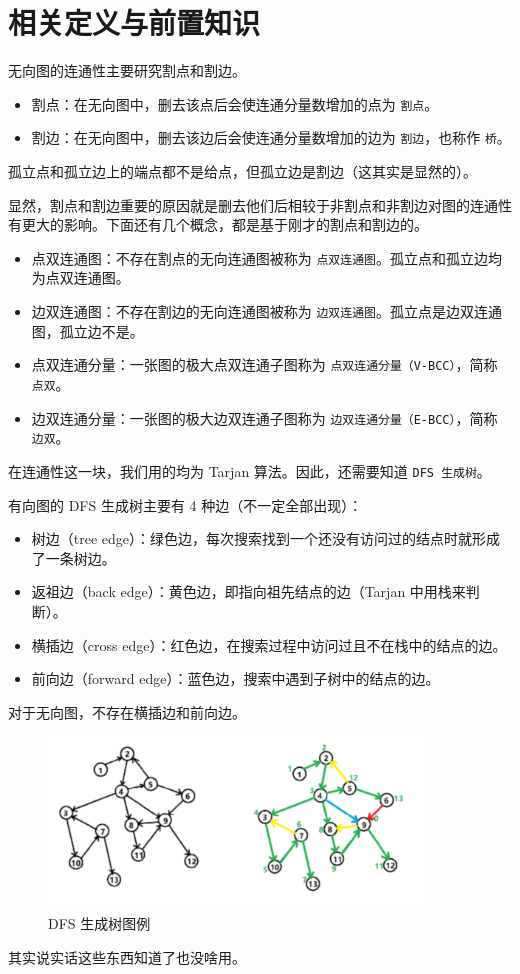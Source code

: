 \documentclass[10pt,twoside,a4paper,UTF8]{ctexbook}
\begin{document}
	\section{相关定义与前置知识}
	无向图的连通性主要研究割点和割边。
	\begin{itemize}
		\item 割点：在无向图中，删去该点后会使连通分量数增加的点为 \texttt{割点}。
		\item 割边：在无向图中，删去该边后会使连通分量数增加的边为 \texttt{割边}，也称作 \texttt{桥}。
	\end{itemize}
	\noindent
	孤立点和孤立边上的端点都不是给点，但孤立边是割边（这其实是显然的）。\par
	显然，割点和割边重要的原因就是删去他们后相较于非割点和非割边对图的连通性有更大的影响。下面还有几个概念，都是基于刚才的割点和割边的。\par
	\begin{itemize}
		\item 点双连通图：不存在割点的无向连通图被称为 \texttt{点双连通图}。孤立点和孤立边均为点双连通图。
		\item 边双连通图：不存在割边的无向连通图被称为 \texttt{边双连通图}。孤立点是边双连通图，孤立边不是。
		\item 点双连通分量：一张图的极大点双连通子图称为 \texttt{点双连通分量（V-BCC）}，简称 \texttt{点双}。
		\item 边双连通分量：一张图的极大边双连通子图称为 \texttt{边双连通分量（E-BCC）}，简称 \texttt{边双}。
	\end{itemize}
	
	在连通性这一块，我们用的均为 Tarjan 算法。因此，还需要知道 \texttt{DFS 生成树}。\par
	有向图的 DFS 生成树主要有 4 种边（不一定全部出现）：
	\begin{itemize}
		\item 树边（tree edge）：绿色边，每次搜索找到一个还没有访问过的结点时就形成了一条树边。
		\item 返祖边（back edge）：黄色边，即指向祖先结点的边（Tarjan 中用栈来判断）。
		\item 横插边（cross edge）：红色边，在搜索过程中访问过且不在栈中的结点的边。
		\item 前向边（forward edge）：蓝色边，搜索中遇到子树中的结点的边。
	\end{itemize}
	对于无向图，不存在横插边和前向边。
	\begin{figure}[H]
		\centering
		\includegraphics[width=10cm]{picture/图论/连通性相关/1.png}
		\caption{DFS 生成树图例}
	\end{figure}
	其实说实话这些东西知道了也没啥用。
	
\end{document}

